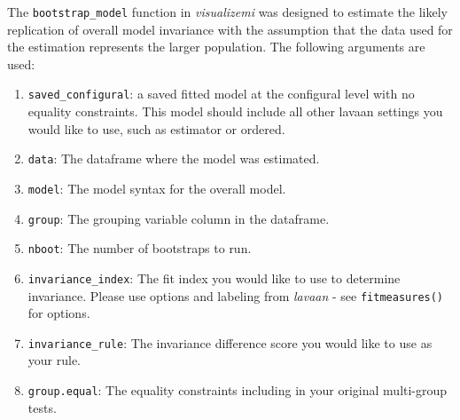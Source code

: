 \documentclass[
  man]{apa7}
\newenvironment{Shaded}{\begin{snugshade}}{\end{snugshade}}
\newcommand{\AttributeTok}[1]{\textcolor[rgb]{0.13,0.29,0.53}{#1}}
\newcommand{\CommentTok}[1]{\textcolor[rgb]{0.56,0.35,0.01}{\textit{#1}}}
\newcommand{\DecValTok}[1]{\textcolor[rgb]{0.00,0.00,0.81}{#1}}
\newcommand{\FunctionTok}[1]{\textcolor[rgb]{0.13,0.29,0.53}{\textbf{#1}}}
\newcommand{\NormalTok}[1]{#1}
\newcommand{\OtherTok}[1]{\textcolor[rgb]{0.56,0.35,0.01}{#1}}
\newcommand{\SpecialCharTok}[1]{\textcolor[rgb]{0.81,0.36,0.00}{\textbf{#1}}}
\newcommand{\StringTok}[1]{\textcolor[rgb]{0.31,0.60,0.02}{#1}}
\providecommand{\tightlist}{%
  \setlength{\itemsep}{0pt}\setlength{\parskip}{0pt}}
\begin{document}
The \texttt{bootstrap\_model} function in \emph{visualizemi} was designed to estimate the likely replication of overall model invariance with the assumption that the data used for the estimation represents the larger population. The following arguments are used:

\begin{enumerate}
\def\labelenumi{\arabic{enumi})}
\tightlist
\item
  \texttt{saved\_configural}: a saved fitted model at the configural level with no equality constraints. This model should include all other lavaan settings you would like to use, such as estimator or ordered.
\item
  \texttt{data}: The dataframe where the model was estimated.
\item
  \texttt{model}: The model syntax for the overall model.
\item
  \texttt{group}: The grouping variable column in the dataframe.
\item
  \texttt{nboot}: The number of bootstraps to run.
\item
  \texttt{invariance\_index}: The fit index you would like to use to determine invariance. Please use options and labeling from \emph{lavaan} - see \texttt{fitmeasures()} for options.
\item
  \texttt{invariance\_rule}: The invariance difference score you would like to use as your rule.
\item
  \texttt{group.equal}: The equality constraints including in your original multi-group tests.
\end{enumerate}

\small

\begin{Shaded}
\end{Shaded}
\end{document}
